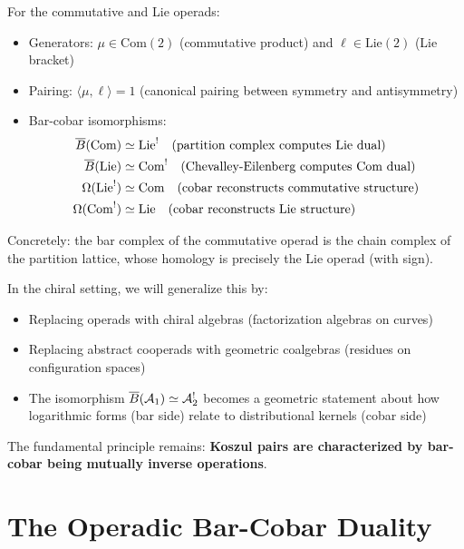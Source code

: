 \begin{example}
\begin{example}
For the commutative and Lie operads:
\begin{itemize}
\item Generators: $\mu \in \text{Com}(2)$ (commutative product) and $\ell \in \text{Lie}(2)$ (Lie bracket)
\item Pairing: $\langle \mu, \ell \rangle = 1$ (canonical pairing between symmetry and antisymmetry)
\item Bar-cobar isomorphisms:
\begin{align*}
\overline{B}(\text{Com}) &\simeq \text{Lie}^! \quad \text{(partition complex computes Lie dual)} \\
\overline{B}(\text{Lie}) &\simeq \text{Com}^! \quad \text{(Chevalley-Eilenberg computes Com dual)} \\
\Omega(\text{Lie}^!) &\simeq \text{Com} \quad \text{(cobar reconstructs commutative structure)} \\
\Omega(\text{Com}^!) &\simeq \text{Lie} \quad \text{(cobar reconstructs Lie structure)}
\end{align*}
\end{itemize}

Concretely: the bar complex of the commutative operad is the chain complex of the partition lattice, whose homology is precisely the Lie operad (with sign).
\end{example}

\begin{remark}
In the chiral setting, we will generalize this by:
\begin{itemize}
\item Replacing operads with chiral algebras (factorization algebras on curves)
\item Replacing abstract cooperads with geometric coalgebras (residues on configuration spaces)
\item The isomorphism $\overline{B}(\mathcal{A}_1) \simeq \mathcal{A}_2^!$ becomes a geometric statement about how logarithmic forms (bar side) relate to distributional kernels (cobar side)
\end{itemize}
The fundamental principle remains: \textbf{Koszul pairs are characterized by bar-cobar being mutually inverse operations}.
\end{remark}

\section{The Operadic Bar-Cobar Duality}
 

\end{example}
